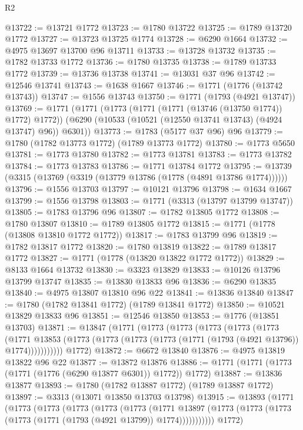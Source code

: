 \begin{lexlean}{R2}
\begin{coremodule}
@13722 := @13721 @1772
@13723 := @1780 @13722
@13725 := @1789 @13720 @1772
@13727 := @13723 @13725 @1774
@13728 := @6290 @1664
@13732 := @4975 @13697 @13700 @96 @13711
@13733 := @13728 @13732
@13735 := @1782 @13733 @1772
@13736 := @1780 @13735
@13738 := @1789 @13733 @1772
@13739 := @13736 @13738
@13741 := @13031 @37 @96
@13742 := @12546 @13741
@13743 := @1638 @1667
@13746 := @1771 (@1776 (@13742 @13743))
@13747 := @1556 @13743
@13750 := @1771 (@1793 (@4921 @13747))
@13769 := @1771
    (@1771
      (@1773 (@1771 (@1771 (@13746 (@13750 @1774)) @1772) @1772))
      (@6290 (@10533 (@10521 (@12550 @13741 @13743) (@4924 @13747) @96)) @6301))
@13773 := @1783 (@5177 @37 @96) @96
@13779 := @1780 (@1782 @13773 @1772) (@1789 @13773 @1772)
@13780 := @1773 @5650
@13781 := @1773 @13780
@13782 := @1773 @13781
@13783 := @1773 @13782
@13784 := @1773 @13783
@13786 := @1771 @13784 @1772
@13795 := @13739 (@3315 (@13769 (@3319 (@13779 @13786 (@1778 (@4891 @13786 @1774))))))
@13796 := @1556 @13703
@13797 := @10121 @13796
@13798 := @1634 @1667
@13799 := @1556 @13798
@13803 := @1771 (@3313 (@13797 @13799 @13747))
@13805 := @1783 @13796 @96
@13807 := @1782 @13805 @1772
@13808 := @1780 @13807
@13810 := @1789 @13805 @1772
@13815 := @1771 (@1778 (@13808 @13810 @1772 @1772))
@13817 := @1783 @13799 @96
@13819 := @1782 @13817 @1772
@13820 := @1780 @13819
@13822 := @1789 @13817 @1772
@13827 := @1771 (@1778 (@13820 @13822 @1772 @1772))
@13829 := @8133 @1664 @13732
@13830 := @3323 @13829
@13833 := @10126 @13796 @13799 @13747
@13835 := @13830 @13833 @96
@13836 := @6290 @13835
@13840 := @4975 @13807 @13810 @96 @22
@13841 := @13836 @13840
@13847 := @1780 (@1782 @13841 @1772) (@1789 @13841 @1772)
@13850 := @10521 @13829 @13833 @96
@13851 := @12546 @13850
@13853 := @1776 (@13851 @13703)
@13871 := @13847
    (@1771
      (@1773
        (@1773
          (@1773
            (@1773
              (@1773
                (@1771
                  @13853
                  (@1773 (@1773 (@1773 (@1773 (@1771 (@1793 (@4921 @13796)) @1774)))))))))))
      @1772)
@13872 := @6672 @13840
@13876 := @4975 @13819 @13822 @96 @22
@13877 := @13872 @13876
@13886 := @1771 (@1771 (@1773 (@1771 (@1776 (@6290 @13877 @6301)) @1772)) @1772)
@13887 := @13836 @13877
@13893 := @1780 (@1782 @13887 @1772) (@1789 @13887 @1772)
@13897 := @3313 (@13071 @13850 @13703 @13798)
@13915 := @13893
    (@1771
      (@1773
        (@1773
          (@1773
            (@1773
              (@1773
                (@1771
                  @13897
                  (@1773 (@1773 (@1773 (@1773 (@1771 (@1793 (@4921 @13799)) @1774)))))))))))
      @1772)

\end{coremodule}
\end{lexlean}

